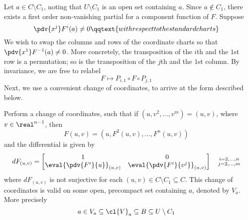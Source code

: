 \documentclass[../main-v2-manifolds.tex]{subfiles}
\begin{document}
\begin{step}\label{lee-sards-case1}
    
\end{step}
Let $a\in C\setminus C_1$, noting that $U\setminus C_1$ is an open set containing $a$. Since $a\notin C_1$, there exists a first order non-vanishing partial for a component function of $F$. Suppose 
\[
    \pdv{x^j}F^{i}(a)\neq 0\qqtext{with respect to the standard charts}
\]
We wish to swap the columns and rows of the coordinate charts so that $\pdv{x^1}F^{-1}(a)\neq 0$. More concretely, the transposition of the $i$th and the $1$st row is a permutation; so is the transposition of the $j$th and the $1$st column. By invariance, we are free to relabel
\[
    F\mapsto P_{i,1}\circ F\circ P_{j,1}
\]
Next, we use a convenient change of coordinates, to arrive at the form described below.
\begin{step}
    Perform a change of coordinates, such that if $(u,v^2,\ldots,v^m) = (u,v)$, where $v\in\real^{n-1}$, then
    \begin{equation}\label{lee-sards-eq-6.2a}
        F(u,v) = (u,F^2(u,v), \ldots, F^n(u,v))
    \end{equation}
    and the differential is given by
    \begin{equation}\label{lee-sards-eq-6.2b}
        dF_{(u,v)} = \begin{bmatrix}
            1&0\\ \eval{\pdv{F^i}{u}}_{(u,v)} & \eval{\pdv{F^i}{v^j}}_{(u,v)}
        \end{bmatrix}\quad \substack{i=2,\ldots,n\\ j=2,\ldots,m}
    \end{equation}
    where $dF_{(u,v)}$ is not surjective for each $(u,v)\in C\setminus C_1\subseteq C$. This change of coordinates is valid on some open, precompact set containing $a$, denoted by $V_a$. More precisely
    \begin{equation}\label{lee-sards-precompact}
    a\in V_a\subseteq\cl{V}_a\subseteq B\subseteq U\setminus C_1
    \end{equation}
\end{step}
\end{document}

